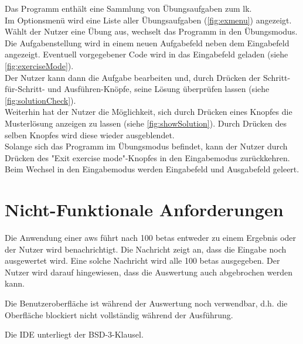 \documentclass[parskip=full,11pt,twoside]{scrartcl}
\begin{document}
Das Programm enthält eine Sammlung von Übungsaufgaben zum \gls{lk}.\\
Im Optionsmenü wird eine Liste aller Übungsaufgaben (\cref{fig:exmenu}) angezeigt.\\
Wählt der Nutzer eine Übung aus, wechselt das Programm in den Übungsmodus. Die Aufgabenstellung wird in einem neuen Aufgabefeld neben dem Eingabefeld angezeigt. Eventuell vorgegebener Code wird in das Eingabefeld geladen (siehe \cref{fig:exerciseMode}).\\
Der Nutzer kann dann die Aufgabe bearbeiten und, durch Drücken der Schritt-für-Schritt- und Ausführen-Knöpfe, seine Lösung überprüfen lassen (siehe \cref{fig:solutionCheck}).\\
Weiterhin hat der Nutzer die Möglichkeit, sich durch Drücken eines Knopfes die Musterlösung anzeigen zu lassen (siehe \cref{fig:showSolution}). Durch Drücken des selben Knopfes wird diese wieder ausgeblendet. \\
Solange sich das Programm im Übungsmodus befindet, kann der Nutzer durch Drücken des "Exit exercise mode"-Knopfes in den Eingabemodus zurückkehren.\\
Beim Wechsel in den Eingabemodus werden Eingabefeld und Ausgabefeld geleert.


\section{Nicht-Funktionale Anforderungen}


Die Anwendung einer \gls{aws} führt nach 100 \glspl{beta} entweder zu einem Ergebnis oder der Nutzer wird benachrichtigt.
Die Nachricht zeigt an, dass die Eingabe noch ausgewertet wird.
Eine solche Nachricht wird alle 100 \glspl{beta} ausgegeben.
Der Nutzer wird darauf hingewiesen, dass die Auswertung auch abgebrochen werden kann.

Die Benutzeroberfläche ist während der Auswertung noch verwendbar, d.h. die Oberfläche blockiert nicht vollständig während der Ausführung.

Die IDE unterliegt der BSD-3-Klausel.
\end{document}
